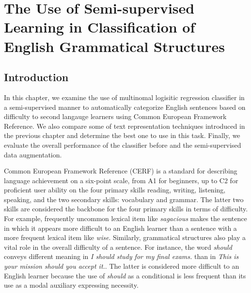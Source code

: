 
\chapter{The Use of Semi-supervised Learning in Classification of English Grammatical Structures} %

\label{Chapter2} %

\section{Introduction}

In this chapter, we examine the use of multinomal logisitic regression classifier in a semi-supervised manner to automatically categorize English sentences based on difficulty to second langauge learners using Common European Framework Reference. We also compare some of text representation techniques introduced in the previous chapter and determine the best one to use in this task. Finally, we evaluate the overall performance of the classifier before and the semi-supervised data augmentation. 

Common European Framework Reference (CERF) is a standard for describing language achievement on a six-point scale, from A1 for beginners, up to C2 for proficient user ability on the four primary skills reading, writing, listening, speaking, and the two secondary skills: vocabulary and grammar. The latter two skills are considered the backbone for the four primary skills in terms of difficulty. For example, frequently uncommon lexical item like \emph{sagacious} makes the sentence in which it appears more difficult to an English learner than a sentence with a more frequent lexical item like \emph{wise}. Similarly, grammatical structures also play a vital role in the overall difficulty of a sentence. For instance, the word \emph{should} conveys different meaning in \emph{I should study for my final exams.} than in \emph{This is your mission should you accept it.}. The latter is considered more difficult to an English learner because the use of \emph{should} as a conditional is less frequent than its use as a modal auxiliary expressing necessity. 

